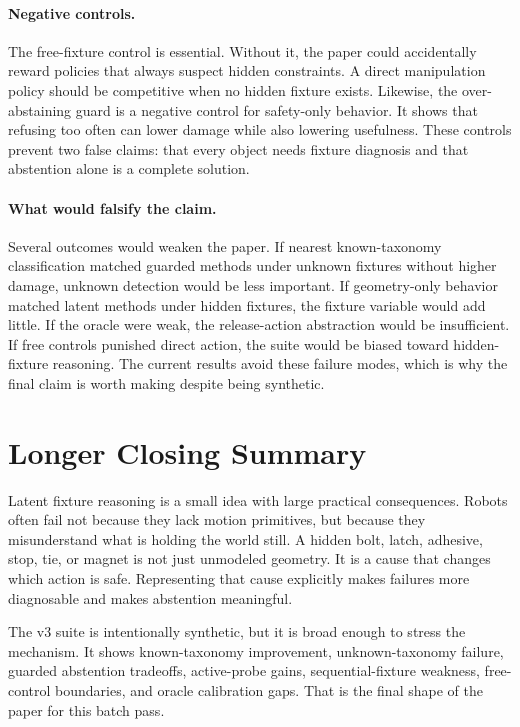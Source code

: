 \documentclass{article}
\begin{document}
\paragraph{Negative controls.}
The free-fixture control is essential. Without it, the paper could accidentally
reward policies that always suspect hidden constraints. A direct manipulation
policy should be competitive when no hidden fixture exists. Likewise, the
over-abstaining guard is a negative control for safety-only behavior. It shows
that refusing too often can lower damage while also lowering usefulness. These
controls prevent two false claims: that every object needs fixture diagnosis
and that abstention alone is a complete solution.

\paragraph{What would falsify the claim.}
Several outcomes would weaken the paper. If nearest known-taxonomy
classification matched guarded methods under unknown fixtures without higher
damage, unknown detection would be less important. If geometry-only behavior
matched latent methods under hidden fixtures, the fixture variable would add
little. If the oracle were weak, the release-action abstraction would be
insufficient. If free controls punished direct action, the suite would be
biased toward hidden-fixture reasoning. The current results avoid these
failure modes, which is why the final claim is worth making despite being
synthetic.

\section{Longer Closing Summary}

Latent fixture reasoning is a small idea with large practical consequences.
Robots often fail not because they lack motion primitives, but because they
misunderstand what is holding the world still. A hidden bolt, latch, adhesive,
stop, tie, or magnet is not just unmodeled geometry. It is a cause that changes
which action is safe. Representing that cause explicitly makes failures more
diagnosable and makes abstention meaningful.

The v3 suite is intentionally synthetic, but it is broad enough to stress the
mechanism. It shows known-taxonomy improvement, unknown-taxonomy failure,
guarded abstention tradeoffs, active-probe gains, sequential-fixture weakness,
free-control boundaries, and oracle calibration gaps. That is the final shape
of the paper for this batch pass.
\end{document}
